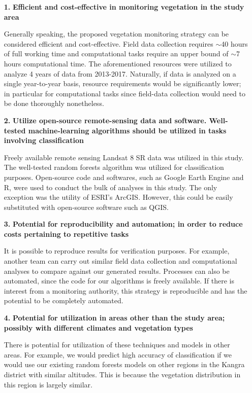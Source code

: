 \begin{itemize}
    \item [\textbf{1.}] \textbf{Efficient and cost-effective in monitoring vegetation in the study area}
     
    Generally speaking, the proposed vegetation monitoring strategy can be considered efficient and cost-effective. Field data collection requires $\sim$40 hours of full working time and computational tasks require an upper bound of $\sim$7 hours computational time. The aforementioned resources were utilized to analyze 4 years of data from 2013-2017. Naturally, if data is analyzed on a single year-to-year basis, resource requirements would be significantly lower; in particular for computational tasks since field-data collection would need to be done thoroughly nonetheless.
    
	\item [\textbf{2.}] \textbf{Utilize open-source remote-sensing data and software. Well-tested machine-learning algorithms should be utilized in tasks involving classification}
	
	Freely available remote sensing Landsat 8 SR data was utilized in this study. The well-tested random forests algorithm was utilized for classification purposes. Open-source code and softwares, such as Google Earth Engine and R, were used to conduct the bulk of analyses in this study. The only exception was the utility of ESRI's ArcGIS. However, this could be easily substituted with open-source software such as QGIS.
	
	\item [\textbf{3.}] \textbf{Potential for reproducibility and automation; in order to reduce costs pertaining to repetitive tasks}
	
	It is possible to reproduce results for verification purposes. For example, another team can carry out similar field data collection and computational analyses to compare against our generated results. Processes can also be automated, since the code for our algorithms is freely available. If there is interest from a monitoring authority, this strategy is reproducible and has the potential to be completely automated.
	
	\item [\textbf{4.}] \textbf{Potential for utilization in areas other than the study area; possibly with different climates and vegetation types}
	
	There is potential for utilization of these techniques and models in other areas. For example, we would predict high accuracy of classification if we would use our existing random forests models on other regions in the Kangra district with similar altitudes. This is because the vegetation distribution in this region is largely similar.
	

\end{itemize}

